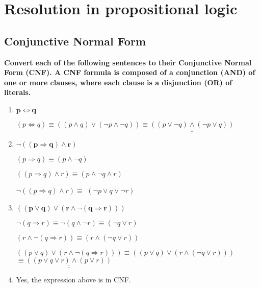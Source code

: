 \section{Resolution in propositional logic}
\subsection{Conjunctive Normal Form}
\begin{large}
    \textbf{Convert each of the following sentences to their Conjunctive Normal Form (CNF).
        A CNF formula is composed of a conjunction (AND) of one or more clauses, where each clause is a disjunction (OR) of literals.}
    \begin{enumerate}
        \item $ \mathbf{p \iff q} $

              $ (p \iff q) \equiv ((p \land q) \lor (\neg p \land \neg q)) \equiv \underline{\underline{((p \lor \neg q) \land (\neg p \lor q))}}$

        \item $ \mathbf{\neg ((p \Rightarrow q) \land r) }$

              $ (p \Rightarrow q ) \equiv  (p \land \neg q) $

              $ (( p \Rightarrow q) \land r) \equiv  (p \land \neg q \land r) $

              $ \neg ((p \Rightarrow q) \land r) \equiv $ \underline{\underline{$(\neg p \lor q \lor \neg r)$}}

        \item $\mathbf{ ((p \lor q) \lor (r \land \neg(q \Rightarrow r))) }$

              $\neg(q \Rightarrow r) \equiv \neg(q \land \neg r) \equiv (\neg q \lor r)$

              $ (r \land \neg(q \Rightarrow r)) \equiv (r \land (\neg q \lor r)) $

              $ ((p \lor q) \lor (r \land \neg(q \Rightarrow r))) \equiv ((p \lor q) \lor (r \land (\neg q \lor r))) $
              $\equiv \underline{\underline{((p \lor q \lor r) \land (p \lor r))}} $

        \item Yes, the expression above is in CNF\@.
    \end{enumerate}
\end{large}


